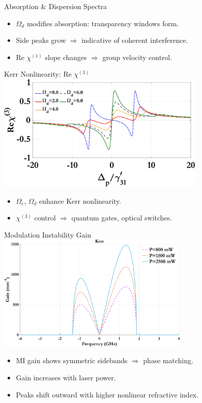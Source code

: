 \documentclass[12pt,aspectratio=1610]{beamer}
\begin{document}
\begin{frame}{Absorption \& Dispersion Spectra}
\begin{figure}[h]
\begin{minipage}{0.48\textwidth}
      \subcaption{}
    \end{minipage}\label{fig:chi1_d}
   \end{figure}
   \begin{itemize}
    \item $\Omega_d$ modifies absorption: transparency windows form.
    \item Side peaks grow $\Rightarrow$ indicative of coherent interference.
    \item Re $\chi^{(1)}$ slope changes $\Rightarrow$ group velocity control.
  \end{itemize}
\end{frame}

\begin{frame}{Kerr Nonlinearity: Re $\chi^{(3)}$}
  \vspace{-4pt}
  \hspace*{43pt}
  \includegraphics[width=0.75\textwidth]{Assets/Real_chi3_Omega_d.jpeg}
  \begin{itemize}
    \item $\Omega_c$, $\Omega_d$ enhance Kerr nonlinearity.
    \item $\chi^{(3)}$ control $\Rightarrow$ quantum gates, optical switches.
  \end{itemize}
\end{frame}

\begin{frame}{Modulation Instability Gain}
  \hspace*{45pt}
  \includegraphics[width=0.69\textwidth]{Assets/G_v_Power.jpeg}
  \begin{itemize}
    \item MI gain shows symmetric sidebands $\Rightarrow$ phase matching.
    \item Gain increases with laser power.
    \item Peaks shift outward with higher nonlinear refractive index.
  \end{itemize}
\end{frame}
\end{document}
